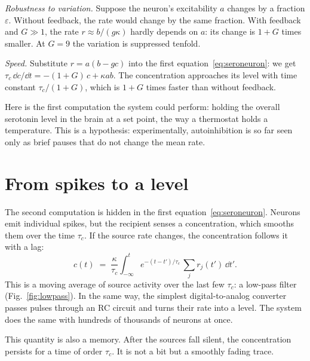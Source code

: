 \emph{Robustness to variation.} Suppose the neuron's excitability $a$ changes by a fraction $\varepsilon$. Without feedback, the rate would change by the same fraction. With feedback and $G\gg1$, the rate $r\approx b/(g\kappa)$ hardly depends on $a$: its change is $1+G$ times smaller. At $G=9$ the variation is suppressed tenfold.

\emph{Speed.} Substitute $r=a(b-gc)$ into the first equation~\eqref{eq:seroneuron}: we get $\tau_c\,\dd c/\dd t=-(1+G)\,c+\kappa ab$. The concentration approaches its level with time constant $\tau_c/(1+G)$, which is $1+G$ times faster than without feedback.

Here is the first computation the  system could perform: holding the overall serotonin level in the brain at a set point, the way a thermostat holds a temperature. This is a hypothesis: experimentally, autoinhibition is so far seen only as brief pauses that do not change the mean rate.

\section{From spikes to a level}

The second computation is hidden in the first equation~\eqref{eq:seroneuron}. Neurons emit individual spikes, but the recipient senses a concentration, which smooths them over the time $\tau_c$. If the source rate changes, the concentration follows it with a lag:
\begin{equation}
c(t) \;=\; \frac{\kappa}{\tau_c}\int_{-\infty}^{t} e^{-(t-t')/\tau_c}\,\sum_j r_j(t')\,\dd t' .
\label{eq:lowpass}
\end{equation}
This is a moving average of source activity over the last few $\tau_c$: a low-pass filter (Fig.~\ref{fig:lowpass}). In the same way, the simplest digital-to-analog converter passes pulses through an RC circuit and turns their rate into a level. The  system does the same with hundreds of thousands of neurons at once.

This quantity is also a memory. After the sources fall silent, the concentration persists for a time of order $\tau_c$. It is not a bit but a smoothly fading trace.

